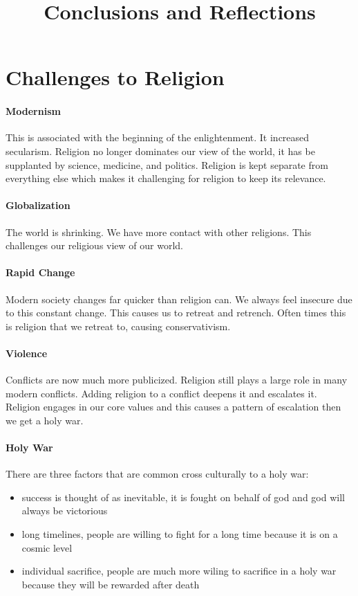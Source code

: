 \documentclass{article}
\begin{document}
\title{Conclusions and Reflections}
\maketitle

\section*{Challenges to Religion}
\label{sec:challenges_to_religion}
\paragraph{Modernism}
\label{par:modernism}
This is associated with the beginning of the enlightenment. It increased secularism. Religion no longer dominates our view of the world, it has be supplanted by science, medicine, and politics. Religion is kept separate from everything else which makes it challenging for religion to keep its relevance.

\paragraph{Globalization}
\label{par:globalization}
The world is shrinking. We have more contact with other religions. This challenges our religious view of our world.

\paragraph{Rapid Change}
\label{par:rapid_change}
Modern society changes far quicker than religion can. We always feel insecure due to this constant change. This causes us to retreat and retrench. Often times this is religion that we retreat to, causing conservativism.

\paragraph{Violence}
\label{par:violence}
Conflicts are now much more publicized. Religion still plays a large role in many modern conflicts. Adding religion to a conflict deepens it and escalates it. Religion engages in our core values and this causes a pattern of escalation then we get a holy war.

\paragraph{Holy War}
\label{par:holy_war}
There are three factors that are common cross culturally to a holy war:
\begin{itemize}
	\item success is thought of as inevitable, it is fought on behalf of god and god will always be victorious
	\item long timelines, people are willing to fight for a long time because it is on a cosmic level
	\item individual sacrifice, people are much more wiling to sacrifice in a holy war because they will be rewarded after death
\end{itemize}
\end{document}
